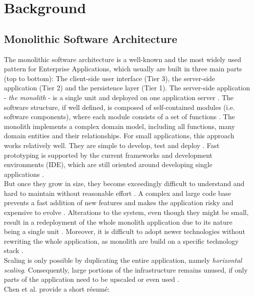 \chapter{Background}
\label{ch:background}

\section{Monolithic Software Architecture}
\label{sec:background:monolith}
The monolithic software architecture is a well-known and the most widely used pattern for Enterprise Applications, which usually are built in three main parts (top to bottom): The client-side user interface (Tier 3), the server-side application (Tier 2) and the persistence layer (Tier 1). The server-side application - \textit{the monolith} - is a single unit and deployed on one application server \cite{infoq}. The software structure, if well defined, is composed of self-contained modules (i.e. software components), where each module consists of a set of functions \cite{HeuristicsAlwis}.
The monolith implements a complex domain model, including all functions, many domain entities and their relationships.
For small applications, this approach works relatively well. They are simple to develop, test and deploy \cite{FunctionalDecompositionHeinrich}. Fast prototyping is supported by the current frameworks and development environments (IDE), which are still oriented around developing single applications \cite{infoq}.
\\
But once they grow in size, they become exceedingly difficult to understand and hard to maintain without reasonable effort \cite{FunctionalDecompositionHeinrich} \cite{ClassificationOfRefactoring}. A complex and large code base prevents a fast addition of new features and makes the application risky and expensive to evolve \cite{TowardsTechnique}.
Alterations to the system, even though they might be small, result in a redeployment of the whole monolith application due to its nature being a single unit \cite{FunctionalDecompositionHeinrich}. Moreover, it is difficult to adopt newer technologies without rewriting the whole application, as monolith are build on a specific technology stack \cite{infoq} \cite{ExtractionMazlami}.\\
Scaling is only possible by duplicating the entire application, namely \textit{horizontal scaling}. Consequently, large portions of the infrastructure remains unused, if only parts of the application need to be upscaled or even used \cite{EnticeApproach} \cite{MigratingTowardsSurvey}. \\
Chen et al. provide a short résumé:

